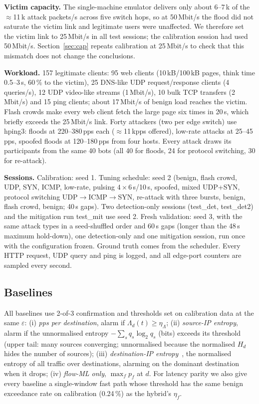 \documentclass[conference]{IEEEtran}
\begin{document}
\textbf{Victim capacity.} The single-machine emulator delivers only about 6--7\,k of the $\approx$11\,k attack packets/s across five switch hops, so at 50\,Mbit/s the flood did not saturate the victim link and legitimate users were unaffected. We therefore set the victim link to 25\,Mbit/s in all test sessions; the calibration session had used 50\,Mbit/s. Section~\ref{sec:cap} repeats calibration at 25\,Mbit/s to check that this mismatch does not change the conclusions.

\textbf{Workload.} 157 legitimate clients: 95 web clients (10\,kB/100\,kB pages, think time 0.5--3\,s, 60\,\% to the victim), 25 DNS-like UDP request/response clients (4 queries/s), 12 UDP video-like streams (1\,Mbit/s), 10 bulk TCP transfers (2\,Mbit/s) and 15 ping clients; about 17\,Mbit/s of benign load reaches the victim. Flash crowds make every web client fetch the large page six times in 20\,s, which briefly exceeds the 25\,Mbit/s link. Forty attackers (two per edge switch) use hping3: floods at 220--380\,pps each ($\approx$11\,kpps offered), low-rate attacks at 25--45\,pps, spoofed floods at 120--180\,pps from four hosts. Every attack draws its participants from the same 40 bots (all 40 for floods, 24 for protocol switching, 30 for re-attack).

\textbf{Sessions.} Calibration: seed 1. Tuning schedule: seed 2 (benign, flash crowd, UDP, SYN, ICMP, low-rate, pulsing $4\times$6\,s/10\,s, spoofed, mixed UDP+SYN, protocol switching UDP$\to$ICMP$\to$SYN, re-attack with three bursts, benign, flash crowd, benign; 40\,s gaps). Two detection-only sessions (test\_det, test\_det2) and the mitigation run test\_mit use seed 2. Fresh validation: seed 3, with the same attack types in a seed-shuffled order and 60\,s gaps (longer than the 48\,s maximum hold-down), one detection-only and one mitigation session, run once with the configuration frozen. Ground truth comes from the scheduler. Every HTTP request, UDP query and ping is logged, and all edge-port counters are sampled every second.

\subsection{Baselines}
All baselines use 2-of-3 confirmation and thresholds set on calibration data at the same $\varepsilon$: (i) \emph{pps per destination}, alarm if $\Lambda_d(t)\ge\eta_\Lambda$; (ii) \emph{source-IP entropy}, alarm if the unnormalised entropy $-\sum_s q_s\log_2 q_s$ (bits) exceeds its threshold (upper tail: many sources converging; unnormalised because the normalised $H_d$ hides the number of sources); (iii) \emph{destination-IP entropy}~\cite{mousavi2015early}, the normalised entropy of all traffic over destinations, alarming on the dominant destination when it drops; (iv) \emph{flow-ML only}, $\max_f p_f$ at $d$. For latency parity we also give every baseline a single-window fast path whose threshold has the same benign exceedance rate on calibration (0.24\,\%) as the hybrid's $\eta_f$.
\end{document}
